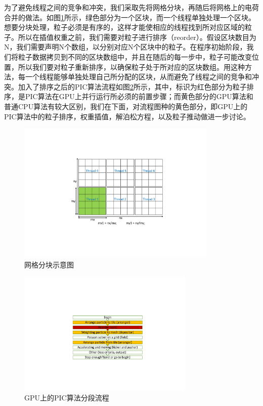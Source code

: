 为了避免线程之间的竞争和冲突，我们采取先将网格分块，再随后将网格上的电荷合并的做法。如图\ref{fig:PIC_tile}所示，绿色部分为一个区块，而一个线程单独处理一个区块。想要分块处理，粒子必须是有序的，这样才能使相应的线程找到所对应区域的粒子。所以在插值权重之前，我们需要对粒子进行排序（reorder）。假设区块数目为N，我们需要声明N个数组，以分别对应N个区块中的粒子。在程序初始阶段，我们将粒子数据拷贝到不同的区块数组中，并且在随后的每一步中，粒子可能改变位置，所以我们要对粒子重新排序，以确保粒子处于所对应的区块数组。用这种方法，每一个线程能够单独处理自己所分配的区块，从而避免了线程之间的竞争和冲突。加入了排序之后的PIC算法流程如图\ref{fig:PIC_flow_reorder}所示，其中，标识为红色部分为粒子排序，是PIC算法在GPU上并行运行所必须的前置步骤；而黄色部分的GPU算法和普通CPU算法有较大区别，我们在下面，对流程图种的黄色部分，即GPU上的PIC算法中的粒子排序，权重插值，解泊松方程，以及粒子推动做进一步讨论。

\begin{figure}[!htb]
    \centering
    \includegraphics[width=0.85\textwidth]{Img/3PIC_tile.pdf}
    \caption{网格分块示意图}
    \label{fig:PIC_tile}
\end{figure}

\begin{figure}[!htb]
    \centering
    \includegraphics[width=0.75\textwidth]{Img/3PIC_flow_reorder.pdf}
    \caption{GPU上的PIC算法分段流程}
    \label{fig:PIC_flow_reorder}
\end{figure}



